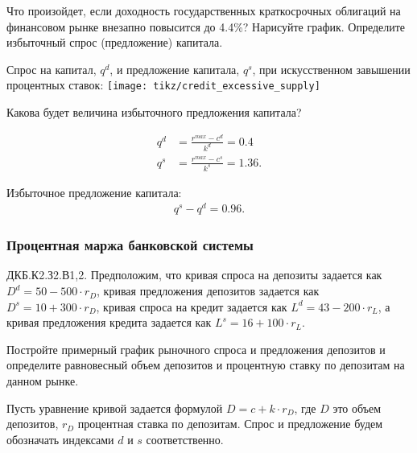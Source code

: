 \documentclass[12pt, table, a4paper,twoside]{exam}
\begin{document}
\begin{questions}
\begin{subparts}
	\subpart[4] Что произойдет, если доходность государственных краткосрочных облигаций на финансовом рынке внезапно повысится до 4.4\%? Нарисуйте график. Определите избыточный спрос (предложение) капитала.
	\begin{solution}[12em]
		Спрос на капитал, $q^d$,  и предложение капитала, $q^s$, при искусственном завышении процентных ставок:
		\centering
		\texttt{[image: tikz/credit\_excessive\_supply]}
		
		\raggedright
	\end{solution}
	
	\subpart[4] Какова будет величина избыточного предложения капитала?
	\begin{solution}[12em]

		\begin{align*}
		q^d&=\frac{r^{max}-c^d}{k^d}=0.4\\
		q^s&=\frac{r^{max}-c^s}{k^s}=1.36.
		\end{align*}

		Избыточное предложение капитала:
		\begin{align*}
		q^s-q^d=0.96.
		\end{align*}
	\end{solution}
	
\end{subparts}
\addpoints


\vfill\null\pagebreak
\subsubsection{Процентная маржа банковской системы}
\question[15] ДКБ.К2.З2.В1,2. Предположим, что кривая спроса на депозиты задается как 
$D^d = 50 - 500 \cdot r_D$, кривая предложения депозитов задается как 
$D^s = 10 + 300 \cdot r_D$, кривая спроса на кредит задается как 
$L^d = 43 - 200 \cdot r_L $, а кривая предложения кредита задается как 
$L^s= 16 + 100 \cdot r_L$.
\noaddpoints

\begin{subparts}
	\subpart[5] Постройте примерный график рыночного спроса и предложения депозитов и определите равновесный объем депозитов и процентную ставку по депозитам на данном рынке.
	
	\begin{solution}[12em]
		
		Пусть уравнение кривой задается формулой $D=c+k \cdot r_D$, где $D$ это объем депозитов, $r_D$ процентная ставка по депозитам. Спрос и предложение будем обозначать индексами $d$ и $s$ соответственно.
		

\end{solution}
\end{subparts}
\end{questions}
\end{document}

